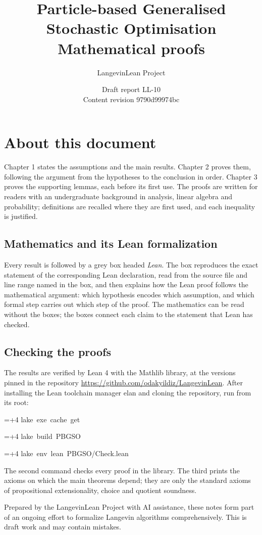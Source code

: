 \documentclass[11pt,a4paper]{report}
\title{\texorpdfstring{Particle-based Generalised Stochastic Optimisation}{Particle-based Generalised Stochastic Optimisation}\\[0.6em]\large Mathematical proofs}
\author{LangevinLean Project}
\date{Draft report LL-10\\[0.4em]\small Content revision 9790d99974bc}
\newlength{\leancharwidth}
\newenvironment{leancode}{\par\smallskip\begingroup\ttfamily\footnotesize\raggedright
  \settowidth{\leancharwidth}{M}\setlength{\parskip}{0pt}\setlength{\parindent}{0pt}
  \frenchspacing}{\par\endgroup\smallskip}
\newcommand{\leanline}[2]{\hangindent=\dimexpr#1\leancharwidth+4\leancharwidth\relax
  \hangafter=1\noindent\hspace*{#1\leancharwidth}#2\par}
\begin{document}
\maketitle
\chapter*{About this document}
Chapter 1 states the assumptions and the main results. Chapter 2 proves them, following the argument from the hypotheses to the conclusion in order. Chapter 3 proves the supporting lemmas, each before its first use. The proofs are written for readers with an undergraduate background in analysis, linear algebra and probability; definitions are recalled where they are first used, and each inequality is justified.

\section*{Mathematics and its Lean formalization}
Every result is followed by a grey box headed \emph{Lean}. The box reproduces the exact statement of the corresponding Lean declaration, read from the source file and line range named in the box, and then explains how the Lean proof follows the mathematical argument: which hypothesis encodes which assumption, and which formal step carries out which step of the proof. The mathematics can be read without the boxes; the boxes connect each claim to the statement that Lean has checked.

\section*{Checking the proofs}
The results are verified by Lean 4 with the Mathlib library, at the versions pinned in the repository \url{https://github.com/odakyildiz/LangevinLean}. After installing the Lean toolchain manager elan and cloning the repository, run from its root:
\begin{leancode}
\leanline{0}{lake\ exe\ cache\ get}
\leanline{0}{lake\ build\ PBGSO}
\leanline{0}{lake\ env\ lean\ PBGSO/Check.lean}
\end{leancode}
The second command checks every proof in the library. The third prints the axioms on which the main theorems depend; they are only the standard axioms of propositional extensionality, choice and quotient soundness.

Prepared by the LangevinLean Project with AI assistance, these notes form part of an ongoing effort to formalize Langevin algorithms comprehensively. This is draft work and may contain mistakes.
\end{document}
